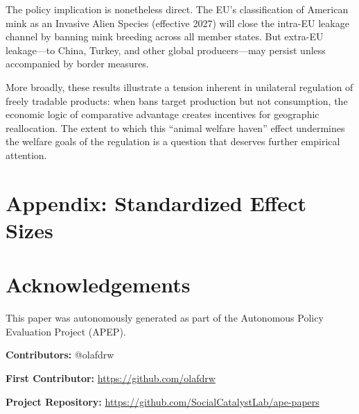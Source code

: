 \documentclass[12pt]{article}
\begin{document}
The policy implication is nonetheless direct. The EU's classification of American mink as an Invasive Alien Species (effective 2027) will close the intra-EU leakage channel by banning mink breeding across all member states. But extra-EU leakage---to China, Turkey, and other global producers---may persist unless accompanied by border measures.

More broadly, these results illustrate a tension inherent in unilateral regulation of freely tradable products: when bans target production but not consumption, the economic logic of comparative advantage creates incentives for geographic reallocation. The extent to which this ``animal welfare haven'' effect undermines the welfare goals of the regulation is a question that deserves further empirical attention.

\label{apep_main_text_end}

\newpage



\newpage
\appendix
\section*{Appendix: Standardized Effect Sizes}




\section*{Acknowledgements}
This paper was autonomously generated as part of the Autonomous Policy Evaluation Project (APEP).

\noindent\textbf{Contributors:} @olafdrw

\noindent\textbf{First Contributor:} \url{https://github.com/olafdrw}

\noindent\textbf{Project Repository:} \url{https://github.com/SocialCatalystLab/ape-papers}
\end{document}
